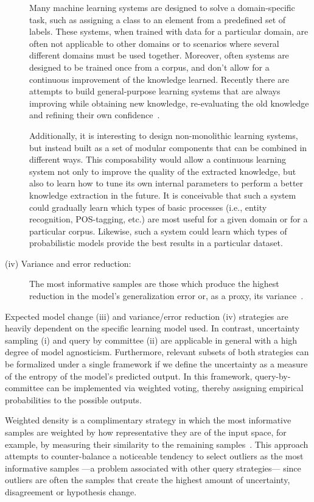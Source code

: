 \begin{description}
Many machine learning systems are designed to solve a domain-specific task, such as
assigning a class to an element from a predefined set of labels. These systems,
when trained with data for a particular domain, are often not applicable to other domains
or to scenarios where several different domains must be used together. Moreover,
often systems are designed to be trained once from a corpus, and don't allow for
a continuous improvement of the knowledge learned.
Recently there are attempts to build general-purpose learning systems that are always
improving while obtaining new knowledge, re-evaluating the old knowledge and refining their
own confidence~\cite{mitchell2015never}.

Additionally, it is interesting to design non-monolithic learning systems, but instead
built as a set of modular components that can be combined in different ways.
This composability would allow a continuous learning system not only to improve the
quality of the extracted knowledge, but also to learn how to tune its own internal
parameters to perform a better knowledge extraction in the future. It is conceivable
that such a system could gradually learn which types of basic processes (i.e., entity recognition, POS-tagging, etc.)
are most useful for a given domain or for a particular corpus. Likewise, such a system could
learn which types of probabilistic models provide the best results in a particular dataset.
\item[(iv) Variance and error reduction:] The most informative samples are those which produce the highest reduction in the model's generalization error or, as a proxy, its variance~\cite{roy2001toward}.
\end{description}

Expected model change (iii) and variance/error reduction (iv) strategies are heavily dependent on the specific learning model used.
In contrast, uncertainty sampling (i) and query by committee (ii) are  applicable in general with a high degree of model agnosticism.
Furthermore, relevant subsets of both strategies can be formalized under a single framework if we define the uncertainty as a measure of the entropy of the model's predicted output.
In this framework, query-by-committee can be implemented via weighted voting, thereby assigning empirical probabilities to the possible outputs.

Weighted density is a complimentary strategy in which the most informative samples are weighted by how representative they are of the input space, for example, by measuring their similarity to the remaining samples~\cite{settles2008analysis}.
This approach attempts to counter-balance a noticeable tendency to select outliers as the most informative samples ---a problem associated with other query strategies--- since outliers are often the samples that create the highest amount of uncertainty, disagreement or hypothesis change.

